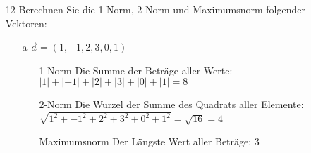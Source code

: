 \documentclass{article}
\begin{document}
\begin{itemize}
\begin{itemize}
		\end{itemize}
		\item[12]{Berechnen Sie die 1-Norm, 2-Norm und Maximumsnorm folgender Vektoren:}
		\begin{itemize}
			\item[a]{$\vec{a}=(1,-1,2,3,0,1)$}
			\begin{itemize}
				\item[1-Norm]{Die Summe der Beträge aller Werte: $|1|+|-1|+|2|+|3|+|0|+|1|=8$}
				\item[2-Norm]{Die Wurzel der Summe des Quadrats aller Elemente: $\sqrt{1^2+-1^2+2^2+3^2+0^2+1^2}=\sqrt{16}=4$}
				\item[Maximumsnorm]{Der Längste Wert aller Beträge: $3$}
			\end{itemize}
		\end{itemize}
	\end{itemize}



	

	























  
\end{document}
